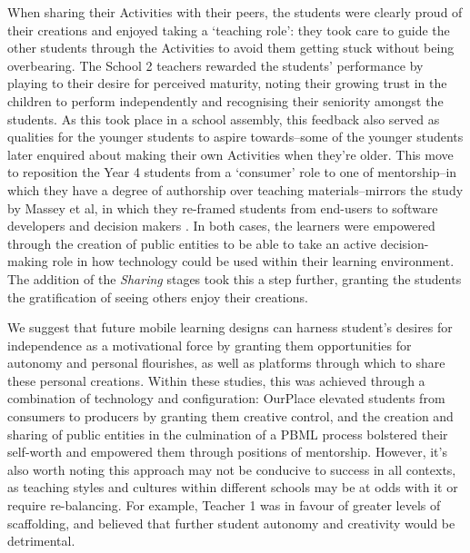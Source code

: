 \documentclass[,hyphens]{sigchi}
\begin{document}
When sharing their Activities with their peers, the students were clearly proud of their creations and enjoyed taking a `teaching role': they took care to guide the other students through the Activities to avoid them getting stuck without being overbearing. The School 2 teachers rewarded the students' performance by playing to their desire for perceived maturity, noting their growing trust in the children to perform independently and recognising their seniority amongst the students. As this took place in a school assembly, this feedback also served as qualities for the younger students to aspire towards--some of the younger students later enquired about making their own Activities when they're older. This move to reposition the Year 4 students from a `consumer' role to one of mentorship--in which they have a degree of authorship over teaching materials--mirrors the study by Massey et al, in which they re-framed students from end-users to software developers and decision makers \cite{Massey2006}. In both cases, the learners were empowered through the creation of public entities to be able to take an active decision-making role in how technology could be used within their learning environment. The addition of the \textit{Sharing} stages took this a step further, granting the students the gratification of seeing others enjoy their creations.
 
We suggest that future mobile learning designs can harness student's desires for independence as a motivational force by granting them opportunities for autonomy and personal flourishes, as well as platforms through which to share these personal creations. Within these studies, this was achieved through a combination of technology and configuration: OurPlace elevated students from consumers to producers by granting them creative control, and the creation and sharing of public entities in the culmination of a PBML process bolstered their self-worth and empowered them through positions of mentorship. However, it's also worth noting this approach may not be conducive to success in all contexts, as teaching styles and cultures within different schools may be at odds with it or require re-balancing. For example, Teacher 1 was in favour of greater levels of scaffolding, and believed that further student autonomy and creativity would be detrimental. 
\end{document}
